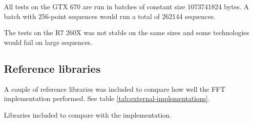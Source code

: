 All tests on the GTX 670 are run in batches of constant size 1073741824 bytes. A batch with 256-point sequences would run a total of 262144 sequences.

The tests on the R7 260X was not stable on the same sizes and some technologies would fail on large sequences.

\subsection{Reference libraries}

A couple of reference libraries was included to compare how well the FFT implementation performed. See table \ref{tab:external-implementations}.

\begin{table}
	\centering
	
	\caption{Libraries included to compare with the implementation.}
	\label{tab:external-implementations}
\end{table}
